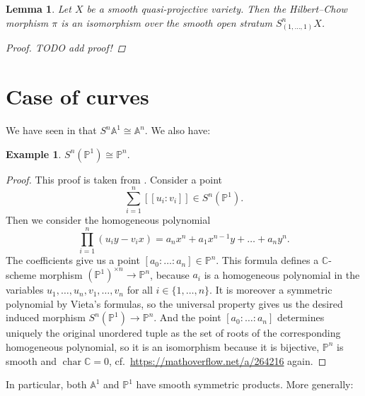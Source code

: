 \documentclass[12pt,a4paper]{amsart}
\theoremstyle{plain}
\newtheorem{lm}[thm]{Lemma}
\theoremstyle{definition}
\newtheorem{exmp}[thm]{Example}
\theoremstyle{remark}
\begin{document}
\begin{lm}\label{lm:overstratum}
  Let $X$ be a smooth quasi-projective variety.
  Then the Hilbert--Chow morphism $\pi$ is an isomorphism over the smooth open stratum $S^{n}_{(1,\ldots,1)}X$.
  \begin{proof}
    \color{red} TODO add proof! \color{black}
  \end{proof}
\end{lm}

\section{Case of curves}

We have seen in  that $S^{n}\mathbb{A}^{1} \cong \mathbb{A}^{n}$.
We also have:

\begin{exmp}\label{exmp:projectiveline}
  $S^{n}(\mathbb{P}^{1}) \cong \mathbb{P}^{n}$.

  \begin{proof}
    This proof is taken from \cite[Example 3.4]{rot16}.
    Consider a point
    \[ \sum_{i = 1}^{n} [[u_{i}:v_{i}]] \in S^{n}(\mathbb{P}^{1}). \]
    Then we consider the homogeneous polynomial
    \[ \prod_{i = 1}^{n} (u_{i}y - v_{i}x) = a_{n} x^{n} + a_{1} x^{n-1}y + \ldots + a_{n}y^{n}. \]
    The coefficients give us a point $[a_{0} : \ldots : a_{n} ] \in \mathbb{P}^{n}$.
    This formula defines a $\mathbb{C}$-scheme morphism $(\mathbb{P}^{1})^{\times n} \to \mathbb{P}^{n}$, because $a_{i}$ is a homogeneous polynomial in the variables $u_{1}, \ldots, u_{n}, v_{1}, \ldots, v_{n}$ for all $i \in \{ 1 , \ldots, n\}$.
    It is moreover a symmetric polynomial by Vieta's formulas, so the universal property gives us the desired induced morphism $S^{n}(\mathbb{P}^{1}) \to \mathbb{P}^{n}$.
    And the point $[a_{0} : \ldots : a_{n}]$ determines uniquely the original unordered tuple as the set of roots of the corresponding homogeneous polynomial, so it is an isomorphism because it is bijective, $\mathbb{P}^{n}$ is smooth and $\operatorname{char}{\mathbb{C}} = 0$, cf.~\url{https://mathoverflow.net/a/264216} again.
  \end{proof}
\end{exmp}

In particular, both $\mathbb{A}^{1}$ and $\mathbb{P}^{1}$ have smooth symmetric products.
More generally:
\end{document}
